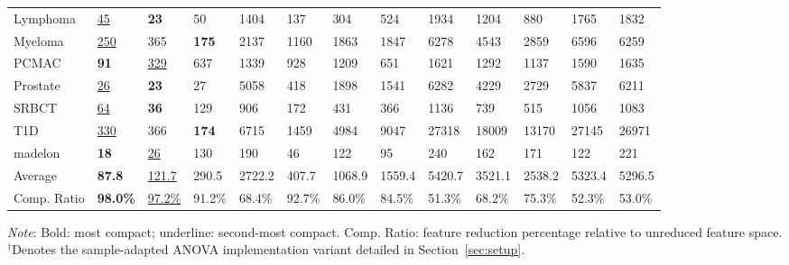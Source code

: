 \begin{table}[t]
{\begin{tabular}{l *{12}{w{c}{33pt}}}
Lymphoma         & \underline{45} & \textbf{23} & 50 & 1404 & 137 & 304 & 524 & 1934 & 1204 & 880 & 1765 & 1832 \\
Myeloma          & \underline{250} & 365 & \textbf{175} & 2137 & 1160 & 1863 & 1847 & 6278 & 4543 & 2859 & 6596 & 6259 \\
PCMAC            & \textbf{91} & \underline{329} & 637 & 1339 & 928 & 1209 & 651 & 1621 & 1292 & 1137 & 1590 & 1635 \\
Prostate         & \underline{26} & \textbf{23} & 27 & 5058 & 418 & 1898 & 1541 & 6282 & 4229 & 2729 & 5837 & 6211 \\
SRBCT            & \underline{64} & \textbf{36} & 129 & 906 & 172 & 431 & 366 & 1136 & 739 & 515 & 1056 & 1083 \\
T1D              & \underline{330} & 366 & \textbf{174} & 6715 & 1459 & 4984 & 9047 & 27318 & 18009 & 13170 & 27145 & 26971 \\
madelon          & \textbf{18} & \underline{26} & 130 & 190 & 46 & 122 & 95 & 240 & 162 & 171 & 122 & 221 \\
\midrule
Average          & \textbf{87.8} & \underline{121.7} & 290.5 & 2722.2 & 407.7 & 1068.9 & 1559.4 & 5420.7 & 3521.1 & 2538.2 & 5323.4 & 5296.5 \\
Comp. Ratio      & \textbf{98.0\%} & \underline{97.2\%} & 91.2\% & 68.4\% & 92.7\% & 86.0\% & 84.5\% & 51.3\% & 68.2\% & 75.3\% & 52.3\% & 53.0\% \\
\bottomrule
\end{tabular}
}
\vspace{2pt}
\par\raggedright\footnotesize
\textit{Note}: Bold: most compact; underline: second-most compact. Comp. Ratio: feature reduction percentage relative to unreduced feature space. $^{\dagger}$Denotes the sample-adapted ANOVA implementation variant detailed in Section~\ref{sec:setup}.
\end{table}